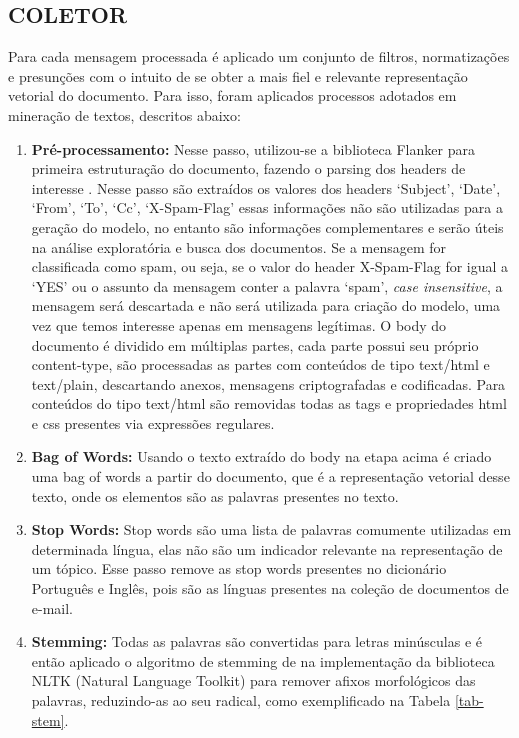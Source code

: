 \documentclass[12pt,a4paper]{article}
\begin{document}
\subsection{COLETOR} \label{sec:coletor}
Para cada mensagem processada é aplicado um conjunto de filtros, normatizações e presunções com o intuito de se obter a mais fiel e relevante representação vetorial do documento.
 Para isso, foram aplicados processos adotados em mineração de textos, descritos abaixo:

\begin{enumerate}
\item \textbf{Pré-processamento:} Nesse passo, utilizou-se a biblioteca Flanker  para primeira estruturação do documento, fazendo o parsing dos headers de interesse \cite{flanker2017}. Nesse passo são extraídos os valores dos headers ‘Subject’, ‘Date’, ‘From’, ‘To’, ‘Cc’, ‘X-Spam-Flag’ essas informações não são utilizadas para a geração do modelo,
 no entanto são informações complementares e serão úteis na análise exploratória e busca dos documentos. Se a mensagem for classificada como spam, ou seja, 
 se o valor do header X-Spam-Flag for igual a ‘YES’ ou o assunto da mensagem conter a palavra ‘spam’, \textit{case insensitive}, a mensagem será descartada e não será utilizada para criação do modelo,
 uma vez que temos interesse apenas em mensagens legítimas. O body do documento é dividido em múltiplas partes, cada parte possui seu próprio content-type,
 são processadas as partes com conteúdos de tipo text/html e text/plain, descartando anexos, mensagens criptografadas e codificadas. 
 Para conteúdos do tipo text/html são removidas todas as tags e propriedades html e css presentes via expressões regulares.
\item \textbf{Bag of Words:} Usando o texto extraído do body na etapa acima é criado uma bag of words a partir do documento, que é a representação vetorial desse texto,
 onde os elementos são as palavras presentes no texto.
\item \textbf{Stop Words:} Stop words são uma lista de palavras comumente utilizadas em determinada língua, elas não são um indicador relevante na representação de um tópico.
 Esse passo remove as stop words presentes no dicionário Português e Inglês, pois são as línguas presentes na coleção de documentos de e-mail.
\item \textbf{Stemming:} Todas as palavras são convertidas para letras minúsculas e é então aplicado o algoritmo de stemming de 
 na implementação da biblioteca NLTK (Natural Language Toolkit)  para remover afixos morfológicos das palavras, reduzindo-as ao seu radical, como exemplificado na Tabela \ref{tab-stem}.

\end{enumerate}
\end{document}
